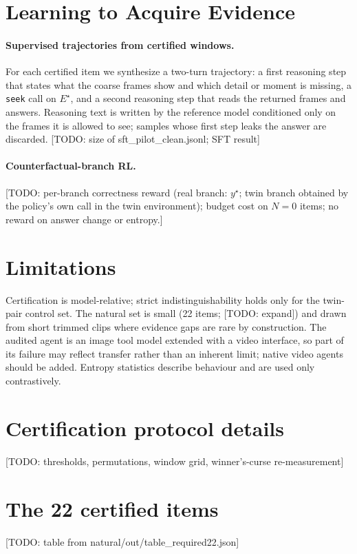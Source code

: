 \documentclass{article}
\newcommand{\todo}[1]{{\color{red}[TODO: #1]}}
\newcommand{\estar}{E^{\star}}
\begin{document}
\section{Learning to Acquire Evidence}
\label{sec:method}
\paragraph{Supervised trajectories from certified windows.} For each certified item we synthesize a two-turn trajectory: a first reasoning step that states what the coarse frames show and which detail or moment is missing, a \texttt{seek} call on $\estar$, and a second reasoning step that reads the returned frames and answers. Reasoning text is written by the reference model conditioned only on the frames it is allowed to see; samples whose first step leaks the answer are discarded. \todo{size of sft\_pilot\_clean.jsonl; SFT result}
\paragraph{Counterfactual-branch RL.} \todo{per-branch correctness reward (real branch: $y^\star$; twin branch obtained by the policy's own call in the twin environment); budget cost on $N{=}0$ items; no reward on answer change or entropy.}

\section{Limitations}
Certification is model-relative; strict indistinguishability holds only for the twin-pair control set. The natural set is small (22 items; \todo{expand}) and drawn from short trimmed clips where evidence gaps are rare by construction. The audited agent is an image tool model extended with a video interface, so part of its failure may reflect transfer rather than an inherent limit; native video agents should be added. Entropy statistics describe behaviour and are used only contrastively.




\appendix
\section{Certification protocol details}
\todo{thresholds, permutations, window grid, winner's-curse re-measurement}
\section{The 22 certified items}
\todo{table from natural/out/table\_required22.json}
\end{document}
